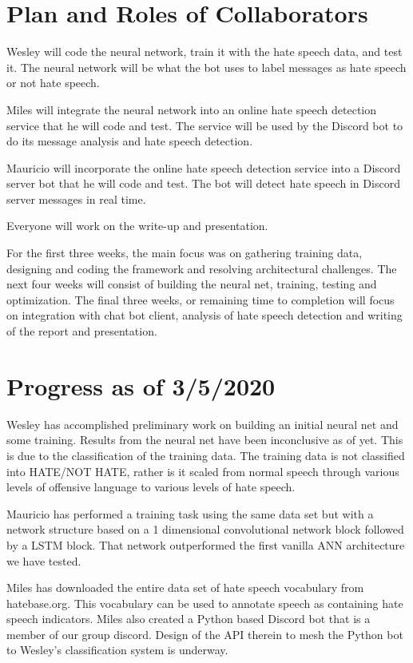 \documentclass[conference]{sig-alternate-05-2015}
\begin{document}
\section{Plan and Roles of Collaborators}

Wesley will code the neural network, train it with the hate speech data, and test it. The neural network will be what the bot uses to label messages as hate speech or not hate speech.

Miles will integrate the neural network into an online hate speech detection service that he will code and test. The service will be used by the Discord bot to do its message analysis and hate speech detection. 

Mauricio will incorporate the online hate speech detection service into a Discord server bot that he will code and test. The bot will detect hate speech in Discord server messages in real time.

Everyone will work on the write-up and presentation.

For the first three weeks, the main focus was on gathering training data, designing and coding the framework and resolving architectural challenges.  The next four weeks will consist of building the neural net, training, testing and optimization.  The final three weeks, or remaining time to completion will focus on integration with chat bot client, analysis of hate speech detection and writing of the report and presentation.

\section{Progress as of 3/5/2020}

Wesley has accomplished preliminary work on building an initial neural net and some training.  Results from the neural net have been inconclusive as of yet.  This is due to the classification of the training data.  The training data is not classified into HATE/NOT HATE, rather is it scaled from normal speech through various levels of offensive language to various levels of hate speech.

Mauricio has performed a training task using the same data set but with a network structure based on a 1 dimensional convolutional network block followed by a LSTM block. That network outperformed the first vanilla ANN architecture we have tested.

Miles has downloaded the entire data set of hate speech vocabulary from hatebase.org.  This vocabulary can be used to annotate speech as containing hate speech indicators.  Miles also created a Python based Discord bot that is a member of our group discord.  Design of the API therein to mesh the Python bot to Wesley's classification system is underway.
\end{document}
